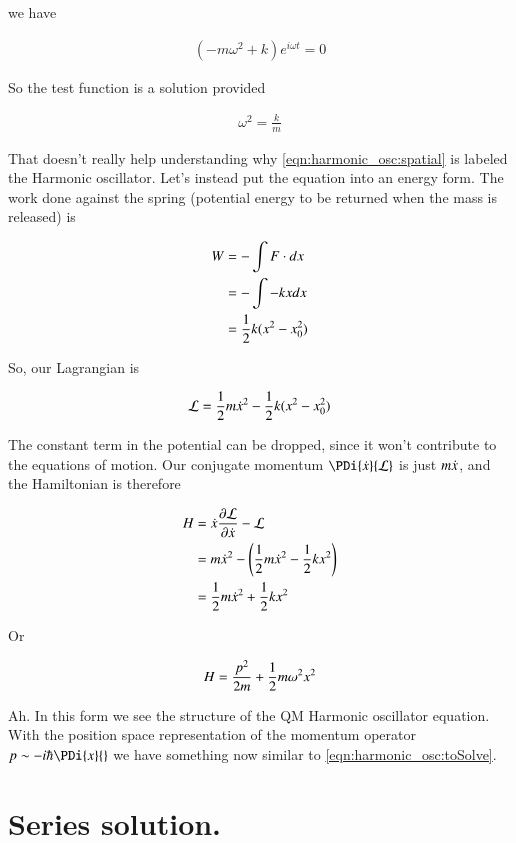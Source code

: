 we have

\begin{align*}
(-m \omega^2 + k) e^{i \omega t} = 0
\end{align*}

So the test function is a solution provided

\begin{align*}
\omega^2 = \frac{k}{m}
\end{align*}

That doesn't really help understanding why \ref{eqn:harmonic_osc:spatial} is labeled the Harmonic oscillator.  Let's instead put the equation into an energy form.  The work done against the spring
(potential energy to be returned when the mass is released) is

\begin{align*}
W 
&= - \int F \cdot dx \\
&= - \int -kx dx \\
&= \frac{1}{2} k (x^2 - x_0^2)
\end{align*}

So, our Lagrangian is

\begin{align*}
\mathcal{L} = \frac{1}{2}m \dot{x}^2 - \frac{1}{2} k (x^2 - x_0^2)
\end{align*}

The constant term in the potential can be dropped, since it won't contribute to the equations of motion.  Our conjugate momentum $\PDi{\xdot}{\LL}$ is just $m \dot{x}$, and the Hamiltonian
is therefore

\begin{align*}
H 
&= \dot{x} \frac{\partial {\mathcal{L}}}{\partial {\dot{x}}} - \mathcal{L} \\
&= m \dot{x}^2  - \left( \frac{1}{2}m \dot{x}^2 - \frac{1}{2} k x^2 \right) \\
&= \frac{1}{2} m \dot{x}^2  + \frac{1}{2} k x^2 \\
\end{align*}

Or

\begin{align*}
H &= \frac{p^2}{2 m } + \frac{1}{2} m \omega^2 x^2 \\
\end{align*}

Ah.  In this form we see the structure of the QM Harmonic oscillator equation.  With the position space representation of the momentum operator $p \sim -i \hbar \PDi{x}{}$ we have
something now similar to \ref{eqn:harmonic_osc:toSolve}.

\section{Series solution. }

